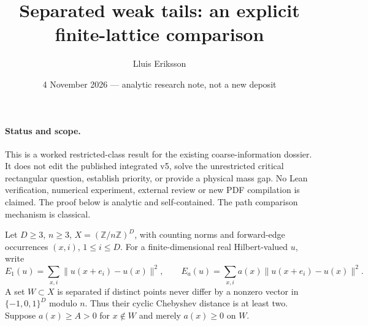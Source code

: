 \documentclass[11pt]{article}
\title{Separated weak tails: an explicit finite-lattice comparison}
\author{Lluis Eriksson}
\date{4 November 2026 --- analytic research note, not a new deposit}
\begin{document}
\maketitle
\paragraph{Status and scope.} This is a worked restricted-class result for the existing coarse-information dossier. It does not edit the published integrated v5, solve the unrestricted critical rectangular question, establish priority, or provide a physical mass gap. No Lean verification, numerical experiment, external review or new PDF compilation is claimed. The proof below is analytic and self-contained. The path comparison mechanism is classical.

Let $D\ge3$, $n\ge3$, $X=(\mathbb Z/n\mathbb Z)^D$, with counting norms and forward-edge occurrences $(x,i)$, $1\le i\le D$. For a finite-dimensional real Hilbert-valued $u$, write
\[
 E_1(u)=\sum_{x,i}\|u(x+e_i)-u(x)\|^2,
 \qquad E_a(u)=\sum_{x,i}a(x)\|u(x+e_i)-u(x)\|^2.
\]
A set $W\subset X$ is separated if distinct points never differ by a nonzero vector in $\{-1,0,1\}^D$ modulo $n$. Thus their cyclic Chebyshev distance is at least two. Suppose $a(x)\ge A>0$ for $x\notin W$ and merely $a(x)\ge0$ on $W$.
\end{document}
